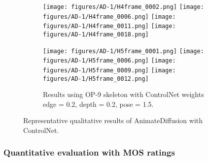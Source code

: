 \documentclass[final-report]{report-template}
\begin{document}
\begin{figure}[htbp]
  \begin{subfigure}[t]{\textwidth}
    \centering
    \texttt{[image: figures/AD-1/H4frame\_0002.png]}
    \texttt{[image: figures/AD-1/H4frame\_0006.png]}
    \texttt{[image: figures/AD-1/H4frame\_0011.png]}
    \texttt{[image: figures/AD-1/H4frame\_0018.png]}
  \end{subfigure}

  \begin{subfigure}[t]{\textwidth}
    \centering
    \texttt{[image: figures/AD-1/H5frame\_0001.png]}
    \texttt{[image: figures/AD-1/H5frame\_0006.png]}
    \texttt{[image: figures/AD-1/H5frame\_0009.png]}
    \texttt{[image: figures/AD-1/H5frame\_0012.png]}
    \caption{Results using OP-9 skeleton with ControlNet weights edge = 0.2, depth = 0.2, pose = 1.5.}
    \label{bird3op}
  \end{subfigure}

  \caption{Representative qualitative results of AnimateDiffusion with ControlNet.
  }
  \label{fig:merged-figure}
\end{figure}



\subsubsection{Quantitative evaluation with MOS ratings}
\end{document}
